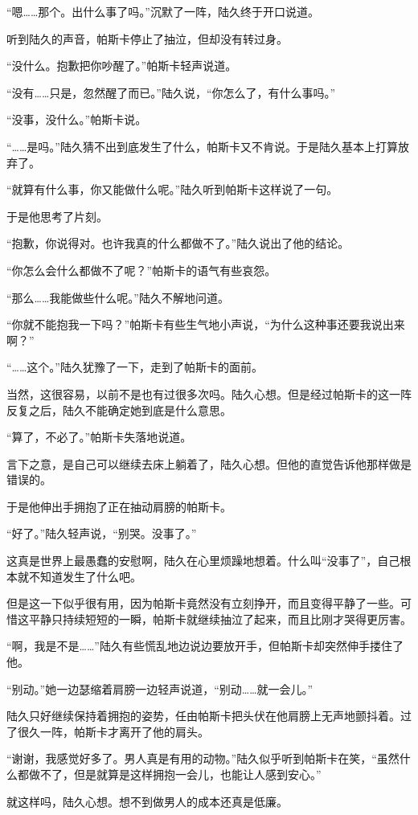 “嗯……那个。出什么事了吗。”沉默了一阵，陆久终于开口说道。

听到陆久的声音，帕斯卡停止了抽泣，但却没有转过身。

“没什么。抱歉把你吵醒了。”帕斯卡轻声说道。

“没有……只是，忽然醒了而已。”陆久说，“你怎么了，有什么事吗。”

“没事，没什么。”帕斯卡说。

“……是吗。”陆久猜不出到底发生了什么，帕斯卡又不肯说。于是陆久基本上打算放弃了。

“就算有什么事，你又能做什么呢。”陆久听到帕斯卡这样说了一句。

于是他思考了片刻。

“抱歉，你说得对。也许我真的什么都做不了。”陆久说出了他的结论。

“你怎么会什么都做不了呢？”帕斯卡的语气有些哀怨。

“那么……我能做些什么呢。”陆久不解地问道。

“你就不能抱我一下吗？”帕斯卡有些生气地小声说，“为什么这种事还要我说出来啊？”

“……这个。”陆久犹豫了一下，走到了帕斯卡的面前。

当然，这很容易，以前不是也有过很多次吗。陆久心想。但是经过帕斯卡的这一阵反复之后，陆久不能确定她到底是什么意思。

“算了，不必了。”帕斯卡失落地说道。

言下之意，是自己可以继续去床上躺着了，陆久心想。但他的直觉告诉他那样做是错误的。

于是他伸出手拥抱了正在抽动肩膀的帕斯卡。

“好了。”陆久轻声说，“别哭。没事了。”

这真是世界上最愚蠢的安慰啊，陆久在心里烦躁地想着。什么叫“没事了”，自己根本就不知道发生了什么吧。

但是这一下似乎很有用，因为帕斯卡竟然没有立刻挣开，而且变得平静了一些。可惜这平静只持续短短的一瞬，帕斯卡就继续抽泣了起来，而且比刚才哭得更厉害。

“啊，我是不是……”陆久有些慌乱地边说边要放开手，但帕斯卡却突然伸手搂住了他。

“别动。”她一边瑟缩着肩膀一边轻声说道，“别动……就一会儿。”

陆久只好继续保持着拥抱的姿势，任由帕斯卡把头伏在他肩膀上无声地颤抖着。过了很久一阵，帕斯卡才离开了他的肩头。

“谢谢，我感觉好多了。男人真是有用的动物。”陆久似乎听到帕斯卡在笑，“虽然什么都做不了，但是就算是这样拥抱一会儿，也能让人感到安心。”

就这样吗，陆久心想。想不到做男人的成本还真是低廉。

